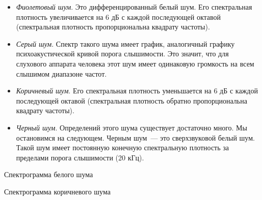 \documentclass{beamer}
\begin{document}
\begin{frame}
\begin{itemize}
\item {\itshape Фиолетовый шум}. Это дифференцированный белый шум. Его спектральная
плотность увеличивается на 6 дБ с каждой последующей октавой (спектральная плотность пропорциональна квадрату частоты).
\item {\itshape Серый шум}. Спектр такого шума имеет график, аналогичный графику психоакустической кривой порога слышимости. Это значит, что для слухового
аппарата человека этот шум имеет одинаковую громкость на всем слышимом диапазоне частот.
\item {\itshape Коричневый шум}. Его спектральная плотность уменьшается на 6 дБ с каждой последующей октавой (спектральная плотность обратно пропорциональна квадрату частоты). 
\item {\itshape Черный шум}. Определений этого шума существует достаточно много. Мы остановимся на следующем. Черным шум~--- это сверхзвуковой белый шум. Такой шум имеет постоянную конечную спектральную плотность за пределами порога слышимости (20 кГц).
\end{itemize}
\end{frame}

\begin{frame}
  \begin{block}{Спектрограмма белого шума}
  \end{block}
\end{frame}

\begin{frame}
  \begin{block}{Спектрограмма коричневого шума}
  \end{block}
\end{frame}
\end{document}
